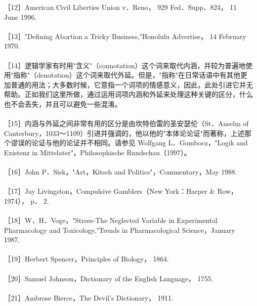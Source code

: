 ［12］American Civil Liberties Union v．Reno， 929 Fed．Supp．824， 11 June 1996.\\\\
［13］"Defining Abortion a Tricky Business,"Honolulu Advertise， 14 February 1970.\\\\
［14］逻辑学家有时用"含义"（connotation）这个词来取代内涵，并较为普遍地使用"指称"（denotation）这个词来取代外延。但是，"指称"在日常话语中有其他更加普通的用法；大多数时候，它意指一个词项的情感意义，因此，此处引进它并无帮助。正如我们这里所做，通过运用词项内涵和外延来处理这种关键的区分，什么也不会丢失，并且可以避免一些混淆。\\\\
［15］内涵与外延之间非常有用的区分是由坎特伯雷的圣安瑟伦（St．Anselm of Canterbury，1033～1109）引进并强调的，他以他的"本体论论证"而著称，上述那个谬误的论证与他的论证并不相同。请参见 Wolfgang L．Gombocz，"Logik and Existenz in Mittelater"，Philosophische Rundschau（1997）。\\\\
［16］John P．Sisk，"Art，Kitsch and Politics"，Commentary，May 1988.\\\\
［17］Jay Livingston，Compulsive Gamblers（New York：Harper \& Row，1974）， p． 2.\\\\
［18］W．H．Voge，"Strees-The Neglected Variable in Experimental Pharmacology and Toxicology,"Trends in Pharmacological Science，January 1987.\\\\
［19］Herbert Spencer，Principles of Biology， 1864.\\\\
［20］Samuel Johnson，Dictionary of the English Language， 1755.\\\\
［21］Ambrose Bierce，The Devil's Dictionary， 1911. 